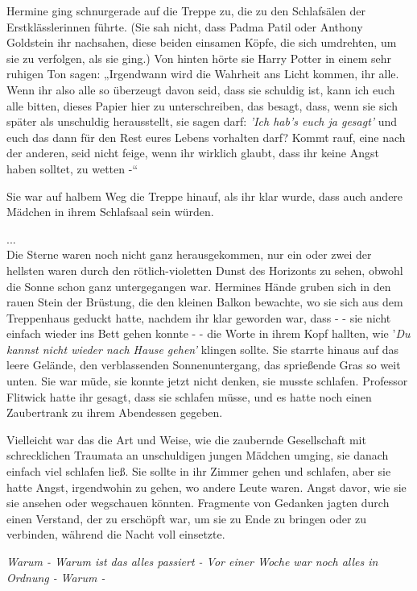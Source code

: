 {Hermine ging schnurgerade auf die Treppe zu, die zu den Schlafsälen der Erstklässlerinnen führte. (Sie sah nicht, dass Padma Patil oder Anthony Goldstein ihr nachsahen, diese beiden einsamen Köpfe, die sich umdrehten, um sie zu verfolgen, als sie ging.) Von hinten hörte sie Harry Potter in einem sehr ruhigen Ton sagen: „Irgendwann wird die Wahrheit ans Licht kommen, ihr alle. Wenn ihr also alle so überzeugt davon seid, dass sie schuldig ist, kann ich euch alle bitten, dieses Papier hier zu unterschreiben, das besagt, dass, wenn sie sich später als unschuldig herausstellt, sie sagen darf: \emph{'Ich hab's euch ja gesagt'} und euch das dann für den Rest eures Lebens vorhalten darf? Kommt rauf, eine nach der anderen, seid nicht feige, wenn ihr wirklich glaubt, dass ihr keine Angst haben solltet, zu wetten -“

Sie war auf halbem Weg die Treppe hinauf, als ihr klar wurde, dass auch andere Mädchen in ihrem Schlafsaal sein würden.

...\\ Die Sterne waren noch nicht ganz herausgekommen, nur ein oder zwei der hellsten waren durch den rötlich-violetten Dunst des Horizonts zu sehen, obwohl die Sonne schon ganz untergegangen war. Hermines Hände gruben sich in den rauen Stein der Brüstung, die den kleinen Balkon bewachte, wo sie sich aus dem Treppenhaus geduckt hatte, nachdem ihr klar geworden war, dass - - sie nicht einfach wieder ins Bett gehen konnte - - die Worte in ihrem Kopf hallten, wie '\emph{Du kannst nicht wieder nach Hause gehen'} klingen sollte. Sie starrte hinaus auf das leere Gelände, den verblassenden Sonnenuntergang, das sprießende Gras so weit unten. Sie war müde, sie konnte jetzt nicht denken, sie musste schlafen. Professor Flitwick hatte ihr gesagt, dass sie schlafen müsse, und es hatte noch einen Zaubertrank zu ihrem Abendessen gegeben.

Vielleicht war das die Art und Weise, wie die zaubernde Gesellschaft mit schrecklichen Traumata an unschuldigen jungen Mädchen umging, sie danach einfach viel schlafen ließ. Sie sollte in ihr Zimmer gehen und schlafen, aber sie hatte Angst, irgendwohin zu gehen, wo andere Leute waren. Angst davor, wie sie sie ansehen oder wegschauen könnten. Fragmente von Gedanken jagten durch einen Verstand, der zu erschöpft war, um sie zu Ende zu bringen oder zu verbinden, während die Nacht voll einsetzte.

\emph{Warum - Warum ist das alles passiert - Vor einer Woche war noch alles in Ordnung -} \emph{Warum -}

}
